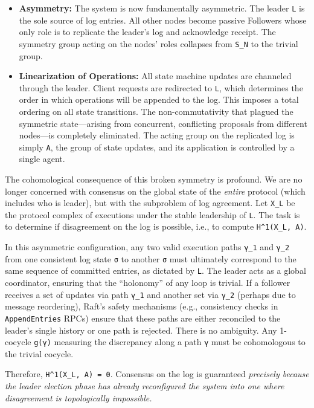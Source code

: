 \documentclass[
]{article}
\begin{document}
\begin{itemize}
\item
  \textbf{Asymmetry:} The system is now fundamentally asymmetric. The
  leader \texttt{L} is the sole source of log entries. All other nodes
  become passive Followers whose only role is to replicate the leader's
  log and acknowledge receipt. The symmetry group acting on the nodes'
  roles collapses from \texttt{S\_N} to the trivial group.
\item
  \textbf{Linearization of Operations:} All state machine updates are
  channeled through the leader. Client requests are redirected to
  \texttt{L}, which determines the order in which operations will be
  appended to the log. This imposes a total ordering on all state
  transitions. The non-commutativity that plagued the symmetric
  state---arising from concurrent, conflicting proposals from different
  nodes---is completely eliminated. The acting group on the replicated
  log is simply \texttt{A}, the group of state updates, and its
  application is controlled by a single agent.
\end{itemize}

The cohomological consequence of this broken symmetry is profound. We
are no longer concerned with consensus on the global state of the
\emph{entire} protocol (which includes who is leader), but with the
subproblem of log agreement. Let \texttt{X\_L} be the protocol complex
of executions under the stable leadership of \texttt{L}. The task is to
determine if disagreement on the log is possible, i.e., to compute
\texttt{H\^{}1(X\_L,\ A)}.

In this asymmetric configuration, any two valid execution paths
\texttt{γ\_1} and \texttt{γ\_2} from one consistent log state \texttt{σ}
to another \texttt{σ\textquotesingle{}} must ultimately correspond to
the same sequence of committed entries, as dictated by \texttt{L}. The
leader acts as a global coordinator, ensuring that the ``holonomy'' of
any loop is trivial. If a follower receives a set of updates via path
\texttt{γ\_1} and another set via \texttt{γ\_2} (perhaps due to message
reordering), Raft's safety mechanisms (e.g., consistency checks in
\texttt{AppendEntries} RPCs) ensure that these paths are either
reconciled to the leader's single history or one path is rejected. There
is no ambiguity. Any 1-cocycle \texttt{g(γ)} measuring the discrepancy
along a path \texttt{γ} must be cohomologous to the trivial cocycle.

Therefore, \texttt{H\^{}1(X\_L,\ A)\ =\ 0}. Consensus on the log is
guaranteed \emph{precisely because the leader election phase has already
reconfigured the system into one where disagreement is topologically
impossible.}
\end{document}
